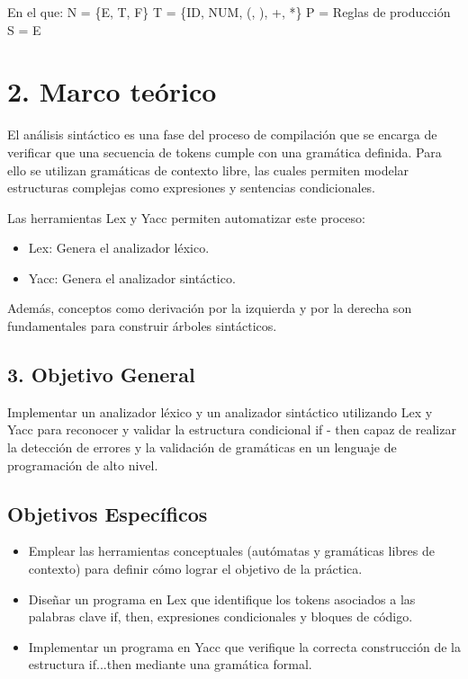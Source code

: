 \documentclass{article}
\begin{document}
En el que:  
N = \{E, T, F\}  
T = \{ID, NUM, (, ), +, *\}  
P = Reglas de producción  
S = E  

\section{2. Marco teórico}

El análisis sintáctico es una fase del proceso de compilación que se encarga de verificar que una secuencia de tokens cumple con una gramática definida. Para ello se utilizan gramáticas de contexto libre, las cuales permiten modelar estructuras complejas como expresiones y sentencias condicionales.

Las herramientas Lex y Yacc permiten automatizar este proceso:
\begin{itemize}
\item Lex: Genera el analizador léxico.
\item Yacc: Genera el analizador sintáctico.
\end{itemize}

Además, conceptos como derivación por la izquierda y por la derecha son fundamentales para construir árboles sintácticos.


\subsection{3. Objetivo General}

Implementar un analizador léxico y un analizador sintáctico utilizando Lex y Yacc para reconocer y validar 
la estructura condicional if - then capaz de realizar la detección de errores y la validación de gramáticas 
en un lenguaje de programación de alto nivel.

\subsection{Objetivos Específicos}

\begin{itemize}
\item Emplear las herramientas conceptuales (autómatas y gramáticas libres de contexto) para definir cómo lograr el objetivo de la práctica.
\item Diseñar un programa en Lex que identifique los tokens asociados a las palabras clave if, then, expresiones condicionales y bloques de código.
\item Implementar un programa en Yacc que verifique la correcta construcción de la estructura if...then mediante una gramática formal.
\end{itemize}
\end{document}
